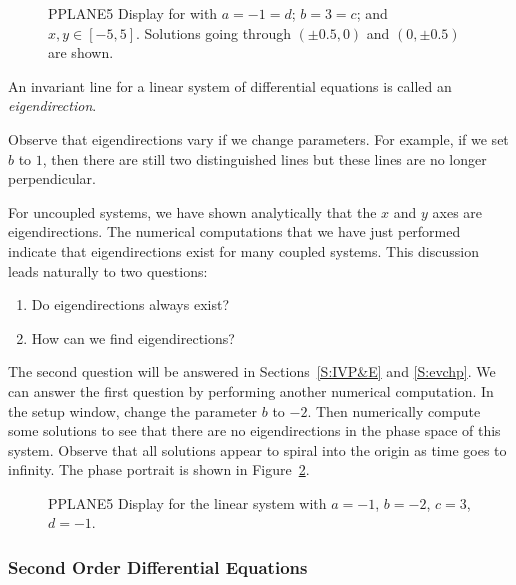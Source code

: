 \documentclass{ximera}
\begin{document}
\begin{figure}[htb]
     \centerline{%
     }
     \caption{{\sf PPLANE5 Display} for \protect{} with
             $a=-1=d$; $b=3=c$; and $x,y\in [-5,5]$.
	Solutions going through $(\pm 0.5,0)$ and $(0,\pm 0.5)$ are shown.}
     \label{F:invariantlines}
\end{figure}

\begin{Def} \label{D:eigendirection}
An invariant line for a linear system of differential equations
is called an {\em eigendirection}.
\end{Def}

Observe that eigendirections vary if we change parameters.  For
example, if we set $b$ to $1$, then there are still two
distinguished lines but these lines are no longer perpendicular.

For uncoupled systems, we have shown analytically that the $x$
and $y$ axes are eigendirections.  The numerical computations
that we have just performed indicate that eigendirections exist
for many coupled systems.  This discussion leads naturally to
two questions:
\begin{enumerate}
\item Do eigendirections always exist?
\item How can we find eigendirections?
\end{enumerate}
The second question will be answered in Sections~\ref{S:IVP&E} and 
\ref{S:evchp}.  We can answer the first question by performing another 
numerical computation.  In the setup window, change the parameter $b$ 
to $-2$.  Then numerically compute some solutions to see that there
are no eigendirections in the phase space of this system.  Observe that
all solutions appear to spiral into the origin as time goes to
infinity.  The phase portrait is shown in Figure~\ref{pp_dsp2}.
\begin{figure}[htb]
      \centerline{%
      }
      \caption{{\sf PPLANE5 Display} for the {\sf linear system}
		with $a=-1$, $b=-2$, $c=3$, $d=-1$.}
      \label{pp_dsp2}
\end{figure}

\subsubsection*{Second Order Differential Equations}
\end{document}
